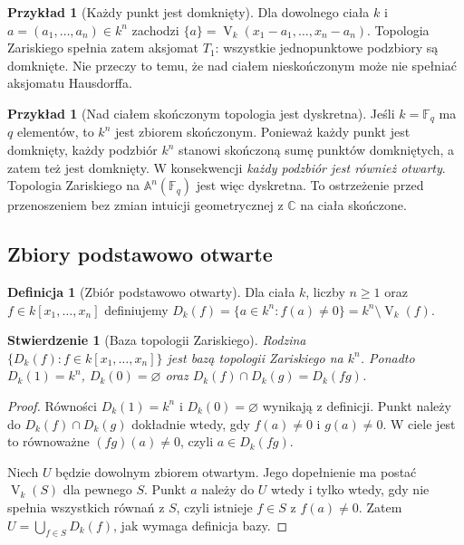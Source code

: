 \documentclass[11pt,a4paper,openany]{report}
\numberwithin{equation}{section}
\theoremstyle{plain}
\newtheorem{stwierdzenie}[twierdzenie]{Stwierdzenie}
\theoremstyle{definition}
\newtheorem{definicja}[twierdzenie]{Definicja}
\newtheorem{przyklad}[twierdzenie]{Przykład}
\theoremstyle{remark}
\newcommand{\C}{\mathbb C}
\newcommand{\F}{\mathbb F}
\newcommand{\A}{\mathbb A}
\newcommand{\V}{\operatorname V}
\begin{document}
\begin{przyklad}[Każdy punkt jest domknięty]
Dla dowolnego ciała $k$ i $a=(a_1,\dots,a_n)\in k^n$
zachodzi $\{a\}=\V_k(x_1-a_1,\dots,x_n-a_n)$.
Topologia Zariskiego spełnia zatem aksjomat $T_1$: wszystkie
jednopunktowe podzbiory są domknięte. Nie przeczy to temu, że
nad ciałem nieskończonym może nie spełniać aksjomatu Hausdorffa.
\end{przyklad}

\begin{przyklad}[Nad ciałem skończonym topologia jest dyskretna]
Jeśli $k=\F_q$ ma $q$ elementów, to $k^n$ jest zbiorem skończonym.
Ponieważ każdy punkt jest domknięty, każdy podzbiór $k^n$
stanowi skończoną sumę punktów domkniętych, a zatem też jest domknięty.
W konsekwencji \emph{każdy podzbiór jest również otwarty}.
Topologia Zariskiego na $\A^n(\F_q)$ jest więc dyskretna.
To ostrzeżenie przed przenoszeniem bez zmian intuicji geometrycznej
z $\C$ na ciała skończone.
\end{przyklad}

\subsection{Zbiory podstawowo otwarte}

\begin{definicja}[Zbiór podstawowo otwarty]
Dla ciała $k$, liczby $n\ge1$ oraz $f\in k[x_1,\dots,x_n]$
definiujemy $D_k(f)=\{a\in k^n:f(a)\ne0\}=k^n\setminus\V_k(f)$.
\end{definicja}

\begin{stwierdzenie}[Baza topologii Zariskiego]
Rodzina $\{D_k(f):f\in k[x_1,\dots,x_n]\}$ jest bazą topologii
Zariskiego na $k^n$. Ponadto $D_k(1)=k^n$, $D_k(0)=\varnothing$
oraz $D_k(f)\cap D_k(g)=D_k(fg)$.
\end{stwierdzenie}
\begin{proof}
Równości $D_k(1)=k^n$ i $D_k(0)=\varnothing$ wynikają z definicji.
Punkt należy do $D_k(f)\cap D_k(g)$ dokładnie wtedy,
gdy $f(a)\ne0$ i $g(a)\ne0$. W ciele jest to równoważne
$(fg)(a)\ne0$, czyli $a\in D_k(fg)$.

Niech $U$ będzie dowolnym zbiorem otwartym.
Jego dopełnienie ma postać $\V_k(S)$ dla pewnego $S$.
Punkt $a$ należy do $U$ wtedy i tylko wtedy, gdy nie spełnia
wszystkich równań z $S$, czyli istnieje $f\in S$ z $f(a)\ne0$.
Zatem $U=\bigcup_{f\in S}D_k(f)$, jak wymaga definicja bazy.
\end{proof}
\end{document}

